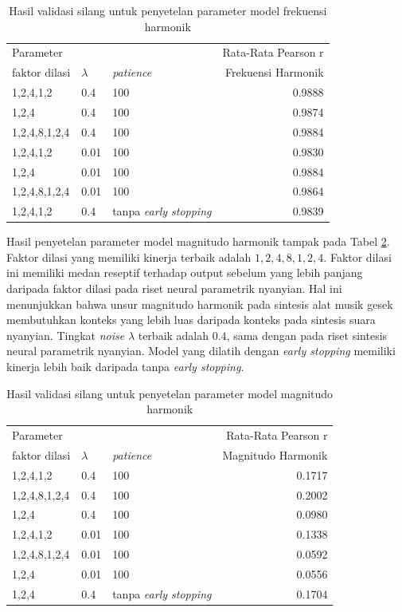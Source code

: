 \begin{table}[htbp]
    \centering
    \caption{Hasil validasi silang untuk penyetelan parameter model frekuensi harmonik}\label{tab-freq-model-tuning-results}
    \begin{tabular}{ |l|l|l|r| } 
     \hline
     \multicolumn{3}{|l|}{Parameter} & Rata-Rata Pearson r\\
     \cline{1-3}
     faktor dilasi & $\lambda$ & \textit{patience} &Frekuensi Harmonik \\
	 \hline 
	1,2,4,1,2 & 0.4 &100           &0.9888\\\hline
	1,2,4 & 0.4 &100               &0.9874\\\hline
	1,2,4,8,1,2,4 & 0.4 &100       &0.9884\\\hline
	1,2,4,1,2 & 0.01 &100          &0.9830\\\hline
	1,2,4 & 0.01 &100              &0.9884\\\hline
	1,2,4,8,1,2,4 & 0.01 &100      &0.9864\\\hline
	1,2,4,1,2 & 0.4 &tanpa \textit{early stopping}   &0.9839\\\hline
    \end{tabular}
\end{table}

Hasil penyetelan parameter model magnitudo harmonik tampak pada Tabel \ref{tab-mag-model-tuning-results}. Faktor dilasi yang memiliki kinerja terbaik adalah $1,2,4,8,1,2,4$. Faktor dilasi ini memiliki medan reseptif terhadap output sebelum yang lebih panjang daripada faktor dilasi pada riset neural parametrik nyanyian. Hal ini menunjukkan bahwa unsur magnitudo harmonik pada sintesis alat musik gesek membutuhkan konteks yang lebih luas daripada konteks pada sintesis suara nyanyian. Tingkat \textit{noise} $\lambda$ terbaik adalah $0.4$, sama dengan pada riset sintesis neural parametrik nyanyian. Model yang dilatih dengan \textit{early stopping} memiliki kinerja lebih baik daripada tanpa \textit{early stopping}.

\begin{table}[htbp]
    \centering
    \caption{Hasil validasi silang untuk penyetelan parameter model magnitudo harmonik}\label{tab-mag-model-tuning-results}
    \begin{tabular}{ |l|l|l|r| } 
     \hline
     \multicolumn{3}{|l|}{Parameter} & Rata-Rata Pearson r\\
     \cline{1-3}
     faktor dilasi & $\lambda$ & \textit{patience} & Magnitudo Harmonik\\
	 \hline 
	1,2,4,1,2 & 0.4 &100           &0.1717\\\hline
	1,2,4,8,1,2,4 & 0.4 &100       &0.2002\\\hline
	1,2,4 & 0.4 &100               &0.0980\\\hline
	1,2,4,1,2 & 0.01 &100          &0.1338\\\hline
	1,2,4,8,1,2,4 & 0.01 &100      &0.0592\\\hline
	1,2,4 & 0.01 &100              &0.0556\\\hline
	1,2,4 & 0.4 &tanpa \textit{early stopping}       &0.1704\\\hline
    \end{tabular}
\end{table}

